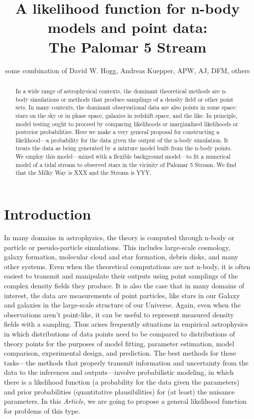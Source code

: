 \documentclass[12pt,pdftex,preprint]{aastex}
\newcommand{\documentname}{\textsl{Article}}
\begin{document}
\title{A likelihood function for n-body models and point data:\\
       The Palomar 5 Stream}
\author{some combination of David W. Hogg, Andreas Kuepper, APW, AJ, DFM, others}

\begin{abstract}
In a wide range of astrophysical contexts, the dominant theoretical
methods are n-body simulations or methods that produce samplings of a
density field or other point sets.  In many contexts, the dominant
observational data are also points in some space: stars on the sky or
in phase space, galaxies in redshift space, and the like.  In
principle, model testing ought to proceed by comparing likelihoods or
marginalized likelihoods or posterior probabilities.  Here we make a
very general proposal for constructing a likelihood---a probability
for the data given the output of the n-body simulation.  It treats the
data as being generated by a mixture model built from the n-body
points.  We employ this model---mixed with a flexible background
model---to fit a numerical model of a tidal stream to observed stars
in the vicinity of Palomar 5 Stream.  We find that the Milky Way is
XXX and the Stream is YYY.
\end{abstract}

\section{Introduction}

In many domains in astrophysics, the theory is computed through n-body
or particle or pseudo-particle simulations.  This includes large-scale
cosmology, galaxy formation, molecular cloud and star formation,
debris disks, and many other systems.  Even when the theoretical
computations are not n-body, it is often easiest to transmit and
manipulate their outputs using point samplings of the complex density
fields they produce.  It is also the case that in many domains of
interest, the data are measurements of point particles, like stars in
our Galaxy and galaxies in the large-scale structure of our Universe.
Again, even when the observations aren't point-like, it can be useful
to represent measured density fields with a sampling.  Thus arises
frequently situations in empirical astrophysics in which distributions
of data points need to be compared to distributions of theory points
for the purposes of model fitting, parameter estimation, model
comparison, experimental design, and prediction.  The best methods for
these tasks---the methods that properly transmit information and
uncertainty from the data to the inferences and outputs---involve
probabilistic modeling, in which there is a likelihood function (a
probability for the data given the parameters) and prior probabilities
(quantitative plausibilities) for (at least) the nuisance parameters.
In this \documentname, we are going to propose a general likelihood
function for problems of this type.
\end{document}
